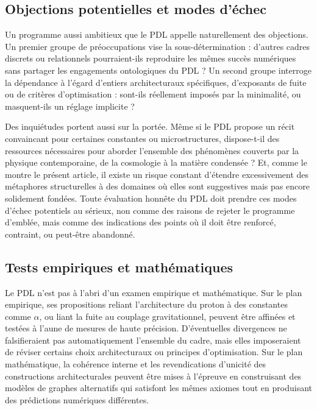 \documentclass[11pt,a4paper]{article}
\theoremstyle{definition}
\begin{document}
\subsection{Objections potentielles et modes d'échec}

Un programme aussi ambitieux que le PDL appelle naturellement des objections. Un premier groupe de préoccupations vise la sous-détermination : d’autres cadres discrets ou relationnels pourraient-ils reproduire les mêmes succès numériques sans partager les engagements ontologiques du PDL ? Un second groupe interroge la dépendance à l’égard d’entiers architecturaux spécifiques, d’exposants de fuite ou de critères d’optimisation : sont-ils réellement imposés par la minimalité, ou masquent-ils un réglage implicite ?\cite{Laubscher_PDL_Position_2024,Laubscher_PDL_GlobalMapping_v6_2024}

Des inquiétudes portent aussi sur la portée. Même si le PDL propose un récit convaincant pour certaines constantes ou microstructures, dispose-t-il des ressources nécessaires pour aborder l’ensemble des phénomènes couverts par la physique contemporaine, de la cosmologie à la matière condensée ? Et, comme le montre le présent article, il existe un risque constant d’étendre excessivement des métaphores structurelles à des domaines où elles sont suggestives mais pas encore solidement fondées.\cite{Laubscher_Existence_PulsatingClosure_2026} Toute évaluation honnête du PDL doit prendre ces modes d’échec potentiels au sérieux, non comme des raisons de rejeter le programme d’emblée, mais comme des indications des points où il doit être renforcé, contraint, ou peut-être abandonné.

\subsection{Tests empiriques et mathématiques}

Le PDL n’est pas à l’abri d’un examen empirique et mathématique. Sur le plan empirique, ses propositions reliant l’architecture du proton à des constantes comme \(\alpha\), ou liant la fuite au couplage gravitationnel, peuvent être affinées et testées à l’aune de mesures de haute précision.\cite{Laubscher_Alpha_v2_2024,Laubscher_UniversalCoherenceLeakage_2024} D’éventuelles divergences ne falsifieraient pas automatiquement l’ensemble du cadre, mais elles imposeraient de réviser certains choix architecturaux ou principes d’optimisation. Sur le plan mathématique, la cohérence interne et les revendications d’unicité des constructions architecturales peuvent être mises à l’épreuve en construisant des modèles de graphes alternatifs qui satisfont les mêmes axiomes tout en produisant des prédictions numériques différentes.\cite{Laubscher_ProtonArch_v2_2024,Laubscher_MinimalClosures_46_2024}
\end{document}
